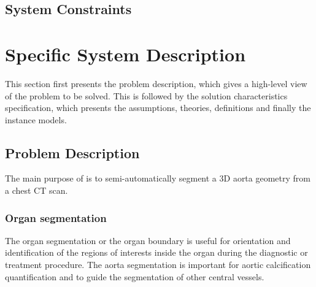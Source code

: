 \documentclass[12pt]{article}
\begin{document}

\subsection{System Constraints}

\section{Specific System Description}

This section first presents the problem description, which gives a high-level
view of the problem to be solved.  This is followed by the solution characteristics
specification, which presents the assumptions, theories, definitions and finally
the instance models.  


\subsection{Problem Description} \label{Sec_pd}

The main purpose of \progname{} is to semi-automatically segment a 3D aorta geometry from a chest CT scan.

\subsubsection{Organ segmentation}
The organ segmentation or the organ boundary is useful for orientation and identification of the regions of interests inside the organ during the diagnostic or treatment procedure. The aorta segmentation is important for aortic calcification quantification and to guide the segmentation of other central vessels.
\end{document}
